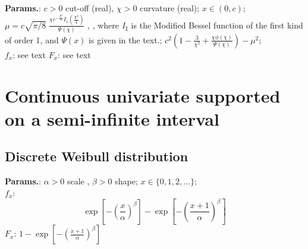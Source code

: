     {\color{darkblue} \textbf{Params.}:} {$c > 0$ cut-off (real),  $\chi > 0$ curvature (real)}; {$x \in (0, c)\!$}; {$\mu = c\sqrt{\pi/8}\;\frac{\chi e^{-\frac{\chi^2}{4}} I_1(\tfrac{\chi^2}{4})}{ \Psi(\chi) }$ , ,  where \textit{I}\textsubscript{1} is the Modified Bessel function of the first kind of order 1, and $\Psi(x)$ is given in the text.}; {$c^2\!\left(1 - \frac{3}{\chi^2} + \frac{\chi\phi(\chi)}{\Psi(\chi)}\right) - \mu^2$};\hspace{0.5cm}\\{\color{darkblue} \textbf{$f_x$}:} {see text}{\color{darkblue} \textbf{$F_x$}:} {see text}



    


    \section{Continuous univariate supported on a semi-infinite interval}
        

        
    
        
\subsection{Discrete Weibull distribution}





    {\color{darkblue} \textbf{Params.}:} {$\alpha> 0 $ scale ,  $\beta >0 $ shape}; {$x \in \{0, 1,2,\ldots\}$};\hspace{0.5cm}\\{\color{darkblue} \textbf{$f_x$}:} {$$\exp\left[-\left(\frac{x  }{\alpha}\right)^\beta \right]-
  	\exp\left[-\left(\frac{x+1}{\alpha}\right)^\beta \right]$$}{\color{darkblue} \textbf{$F_x$}:} {$1-\exp\left[-\left(\frac{x+1}{\alpha}\right)^\beta \right]$}



